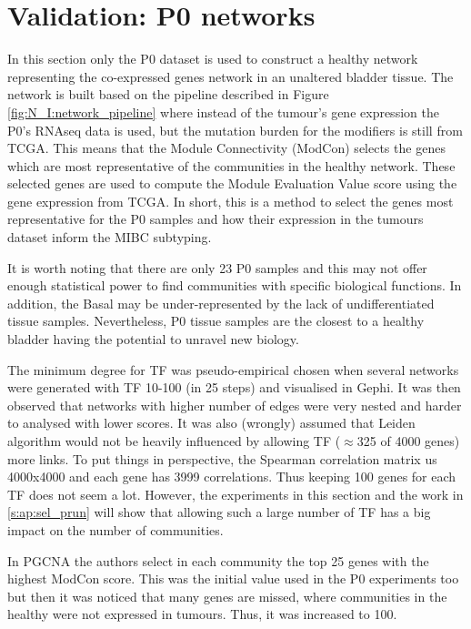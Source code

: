 \section{Validation: P0 networks} \label{s:p0}


In this section only the P0 dataset is used to construct a healthy network representing the co-expressed genes network in an unaltered bladder tissue. The network is built based on the pipeline described in Figure \ref{fig:N_I:network_pipeline} where instead of the tumour's gene expression the P0's RNAseq data is used, but the mutation burden for the modifiers is still from TCGA. This means that the Module Connectivity (ModCon) selects the genes which are most representative of the communities in the healthy network. These selected genes are used to compute the Module Evaluation Value score using the gene expression from TCGA. In short, this is a method to select the genes most representative for the P0 samples and how their expression in the tumours dataset inform the MIBC subtyping. 

It is worth noting that there are only 23 P0 samples and this may not offer enough statistical power to find communities with specific biological functions. In addition, the Basal may be under-represented by the lack of undifferentiated tissue samples. Nevertheless, P0 tissue samples are the closest to a healthy bladder having the potential to unravel new biology.

The minimum degree for TF was pseudo-empirical chosen when several networks were generated with TF 10-100 (in 25 steps) and visualised in Gephi. It was then observed that networks with higher number of edges were very nested and harder to analysed with lower scores. It was also (wrongly) assumed that Leiden algorithm would not be heavily influenced by allowing TF ($\approx$325 of 4000 genes) more links. To put things in perspective, the Spearman correlation matrix us 4000x4000 and each gene has 3999 correlations. Thus keeping 100 genes for each TF does not seem a lot. However, the experiments in this section and the work in \cref{s:ap:sel_prun} will show that allowing such a large number of TF has a big impact on the number of communities.

In PGCNA \citet{Care2019-ij} the authors select in each community the top 25 genes with the highest ModCon score. This was the initial value used in the P0 experiments too but then it was noticed that many genes are missed, where communities in the healthy were not expressed in tumours. Thus, it was increased to 100.

